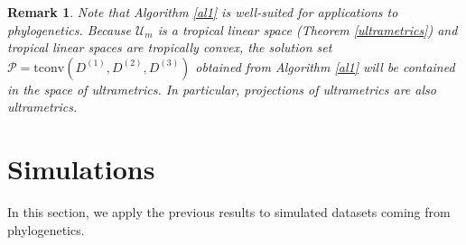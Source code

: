\documentclass[12pt]{extarticle}
\numberwithin{theorem}{section}
\newtheorem{remark}[theorem]{Remark}
\begin{document}
\begin{remark}
Note that Algorithm \ref{al1} is well-suited for applications to phylogenetics. Because $\mathcal U_m$ is a tropical linear space (Theorem \ref{ultrametrics}) and tropical linear spaces are tropically convex, the solution set $\mathcal P = \text{tconv}(D^{(1)},D^{(2)}, D^{(3)})$ obtained from Algorithm \ref{al1} will be contained in the space of ultrametrics. In particular, projections of ultrametrics are also ultrametrics.
\end{remark}



\section{Simulations}\label{sim}

In this section, we apply the previous results to simulated datasets coming from phylogenetics. 
\end{document}

